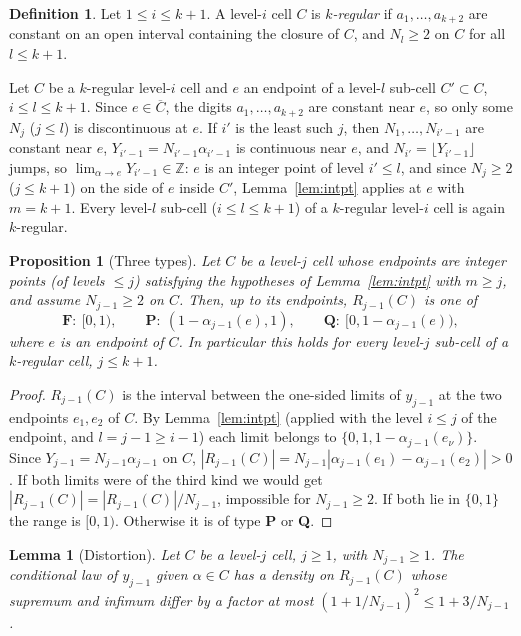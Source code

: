 \documentclass[11pt]{amsart}
\newtheorem{proposition}[theorem]{Proposition}
\newtheorem{lemma}[theorem]{Lemma}
\theoremstyle{definition}
\newtheorem{definition}[theorem]{Definition}
\numberwithin{equation}{section}
\newcommand{\Z}{\mathbb{Z}}
\begin{document}
\begin{definition}\label{def:regular}
Let $1\le i\le k+1$. A level-$i$ cell $C$ is \emph{$k$-regular} if $a_1,\dots,a_{k+2}$ are constant on an open interval containing the
closure of $C$, and $N_l\ge2$ on $C$ for all $l\le k+1$.
\end{definition}

Let $C$ be a $k$-regular level-$i$ cell and $e$ an endpoint of a level-$l$ sub-cell $C'\subset C$, $i\le l\le k+1$. Since $e\in\overline C$,
the digits $a_1,\dots,a_{k+2}$ are constant near $e$, so only some $N_j$ ($j\le l$) is discontinuous at $e$. If $i'$ is the least such
$j$, then $N_1,\dots,N_{i'-1}$ are constant near $e$, $Y_{i'-1}=N_{i'-1}\alpha_{i'-1}$ is continuous near $e$, and $N_{i'}=\lfloor Y_{i'-1}\rfloor$
jumps, so $\lim_{\alpha\to e}Y_{i'-1}\in\Z$: $e$ is an integer point of level $i'\le l$, and since $N_j\ge2$ ($j\le k+1$) on the side of
$e$ inside $C'$, Lemma~\ref{lem:intpt} applies at $e$ with $m=k+1$. Every level-$l$ sub-cell ($i\le l\le k+1$) of a $k$-regular
level-$i$ cell is again $k$-regular.

\begin{proposition}[Three types]\label{prop:types}
Let $C$ be a level-$j$ cell whose endpoints are integer points (of levels $\le j$) satisfying the hypotheses of
Lemma~\ref{lem:intpt} with $m\ge j$, and assume $N_{j-1}\ge2$ on $C$. Then, up to its endpoints, $R_{j-1}(C)$ is one of
\[
\textbf{F}:\ [0,1),\qquad \textbf{P}:\ (1-\alpha_{j-1}(e),1),\qquad \textbf{Q}:\ [0,1-\alpha_{j-1}(e)),
\]
where $e$ is an endpoint of $C$. In particular this holds for every level-$j$ sub-cell of a $k$-regular cell, $j\le k+1$.
\end{proposition}

\begin{proof}
$R_{j-1}(C)$ is the interval between the one-sided limits of $y_{j-1}$ at the two endpoints $e_1,e_2$ of $C$. By
Lemma~\ref{lem:intpt} (applied with the level $i\le j$ of the endpoint, and $l=j-1\ge i-1$) each limit belongs to
$\{0,1,1-\alpha_{j-1}(e_\nu)\}$. Since $Y_{j-1}=N_{j-1}\alpha_{j-1}$ on $C$, $|R_{j-1}(C)|=N_{j-1}|\alpha_{j-1}(e_1)-\alpha_{j-1}(e_2)|>0$. If both
limits were of the third kind we would get $|R_{j-1}(C)|=|R_{j-1}(C)|/N_{j-1}$, impossible for $N_{j-1}\ge2$. If both lie in
$\{0,1\}$ the range is $[0,1)$. Otherwise it is of type \textbf{P} or \textbf{Q}.
\end{proof}

\begin{lemma}[Distortion]\label{lem:distortion}
Let $C$ be a level-$j$ cell, $j\ge1$, with $N_{j-1}\ge1$. The conditional law of $y_{j-1}$ given $\alpha\in C$ has a density on $R_{j-1}(C)$ whose
supremum and infimum differ by a factor at most $(1+1/N_{j-1})^2\le1+3/N_{j-1}$.
\end{lemma}
\end{document}
